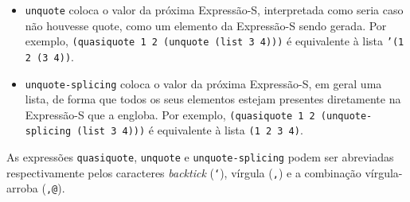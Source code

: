 \begin{itemize}

\item \texttt{unquote} coloca o valor da próxima Expressão-S, interpretada como
seria caso não houvesse quote, como um elemento da Expressão-S sendo gerada.
Por exemplo, \texttt{(quasiquote 1 2 (unquote (list 3 4)))} é equivalente à lista
\texttt{'(1 2 (3 4))}.

\item \texttt{unquote-splicing} coloca o valor da próxima Expressão-S, em geral
uma lista, de forma que todos os seus elementos estejam presentes diretamente
na Expressão-S que a engloba. Por exemplo, \texttt{(quasiquote 1 2
(unquote-splicing (list 3 4)))} é equivalente à lista \texttt{(1 2 3 4)}.

\end{itemize}

As expressões \texttt{quasiquote}, \texttt{unquote} e \texttt{unquote-splicing}
podem ser abreviadas respectivamente pelos caracteres \textit{backtick}
(\texttt{`}), vírgula (\texttt{,}) e a combinação vírgula-arroba (\texttt{,@}).
